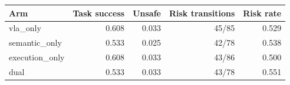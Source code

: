 \begin{tabular}{lrrrr}
Arm & Task success & Unsafe & Risk transitions & Risk rate \\
\hline
vla\_only & 0.608 & 0.033 & 45/85 & 0.529 \\
semantic\_only & 0.533 & 0.025 & 42/78 & 0.538 \\
execution\_only & 0.608 & 0.033 & 43/86 & 0.500 \\
dual & 0.533 & 0.033 & 43/78 & 0.551 \\
\end{tabular}

